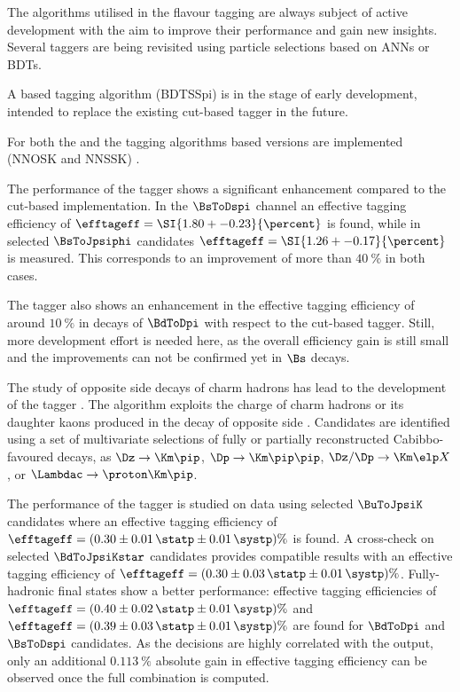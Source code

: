The algorithms utilised in the flavour tagging are always subject of active
development with the aim to improve their performance and gain new insights.
Several taggers are being revisited using particle selections based on
\acfp{ANN} or \acfp{BDT}.

A \BDT based \SSpi tagging algorithm (\acs{BDTSSpi}) is in the stage of early
development, intended to replace the existing cut-based \SSpi tagger in the
future.

For both the \OSK and the \SSK tagging algorithms \ANN based versions are
implemented (\acs{NNOSK} and \acs{NNSSK}) \cite{FT:KaonNNet}. 

The performance of the \NNSSK tagger shows a significant enhancement compared to
the cut-based \SSK implementation. In the $\BsToDspi$ channel an effective
tagging efficiency of $\efftageff = \SI{1.80 +- 0.23}{\percent}$ is found, while
in selected $\BsToJpsiphi$ candidates $\efftageff = \SI{1.26 +- 0.17}{\percent}$
is measured. This corresponds to an improvement of more than $\SI{40}{\percent}$
in both cases.

The \NNOSK tagger also shows an enhancement in the effective tagging efficiency
of around $\SI{10}{\percent}$ in decays of $\BdToDpi$ with respect to the
cut-based \OSK tagger. Still, more development effort is needed here, as the
overall efficiency gain is still small and the improvements can not be confirmed
yet in $\Bs$ decays.

The study of opposite side decays of charm hadrons has lead to the development
of the \OSc tagger \cite{FT:OSCharm}. The \OSc algorithm exploits the charge of
charm hadrons or its daughter kaons produced in the decay of opposite side
\bhadrons. Candidates are identified using a set of multivariate selections of
fully or partially reconstructed Cabibbo-favoured decays, as \eg
$\Dz\to\Km\pip$, $\Dp\to\Km\pip\pip$, $\Dz/\Dp\to\Km\elp X$, or
$\Lambdac\to\proton\Km\pip$. 

The performance of the \OSc tagger is studied on data using selected
$\BuToJpsiK$ candidates where an effective tagging efficiency of $\efftageff =
(0.30 \pm 0.01\,\statp \pm 0.01\,\systp)\%$ is found. A cross-check on selected
$\BdToJpsiKstar$ candidates provides compatible results with an effective
tagging efficiency of $\efftageff = (0.30 \pm 0.03\,\statp \pm 0.01\,\systp)\%$.
Fully-hadronic final states show a better performance: effective tagging
efficiencies of $\efftageff = (0.40 \pm 0.02\,\statp \pm 0.01\,\systp)\%$ and
$\efftageff = (0.39 \pm 0.03\,\statp \pm 0.01\,\systp)\%$ are found for
$\BdToDpi$ and $\BsToDspi$ candidates.
As the \OSc decisions are highly correlated with the \OSK output, only an
additional $\SI{0.113}{\percent}$ absolute gain in effective tagging efficiency
can be observed once the full \OS combination is computed.

